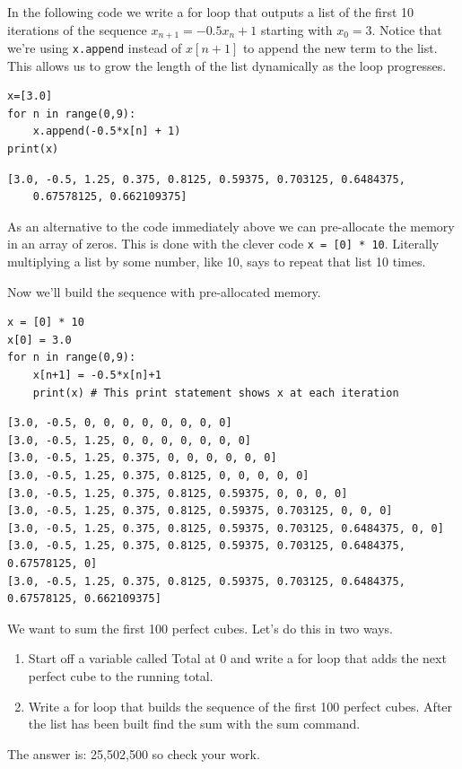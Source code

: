 \begin{example}
    In the following code we write a for loop that outputs a list of the first 10
    iterations of the sequence  $x_{n+1}=−0.5x_n+1$ starting with  $x_0=3$. Notice that
    we're using \texttt{x.append} instead of $x[n+1]$ to append the new term to the list.
    This allows us to grow the length of the list dynamically as the loop progresses.

    \bcode
\begin{lstlisting}
x=[3.0]
for n in range(0,9):
    x.append(-0.5*x[n] + 1)
print(x)
\end{lstlisting}
\boutput
\begin{lstlisting}
[3.0, -0.5, 1.25, 0.375, 0.8125, 0.59375, 0.703125, 0.6484375, 
    0.67578125, 0.662109375]
\end{lstlisting}
\end{example}
As an alternative to the code immediately above we can pre-allocate the memory in an array
of zeros. This is done with the clever code \texttt{x = [0] * 10}. Literally multiplying a
list by some number, like 10, says to repeat that list 10 times.

\begin{example}
    Now we'll build the sequence with pre-allocated memory.

    \bcode
\begin{lstlisting}
x = [0] * 10
x[0] = 3.0
for n in range(0,9):
    x[n+1] = -0.5*x[n]+1
    print(x) # This print statement shows x at each iteration
\end{lstlisting}
\boutput
\begin{lstlisting}
[3.0, -0.5, 0, 0, 0, 0, 0, 0, 0, 0]
[3.0, -0.5, 1.25, 0, 0, 0, 0, 0, 0, 0]
[3.0, -0.5, 1.25, 0.375, 0, 0, 0, 0, 0, 0]
[3.0, -0.5, 1.25, 0.375, 0.8125, 0, 0, 0, 0, 0]
[3.0, -0.5, 1.25, 0.375, 0.8125, 0.59375, 0, 0, 0, 0]
[3.0, -0.5, 1.25, 0.375, 0.8125, 0.59375, 0.703125, 0, 0, 0]
[3.0, -0.5, 1.25, 0.375, 0.8125, 0.59375, 0.703125, 0.6484375, 0, 0]
[3.0, -0.5, 1.25, 0.375, 0.8125, 0.59375, 0.703125, 0.6484375, 0.67578125, 0]
[3.0, -0.5, 1.25, 0.375, 0.8125, 0.59375, 0.703125, 0.6484375, 0.67578125, 0.662109375]
\end{lstlisting}
\end{example}

\begin{problem}
    We want to sum the first 100 perfect cubes. Let's do this in two ways.

    \begin{enumerate}
        \item Start off a variable called Total at 0 and write a for loop that adds the
            next perfect cube to the running total.
        \item  Write a for loop that builds the sequence of the first 100 perfect cubes.
            After the list has been built find the sum with the sum command.
    \end{enumerate}
    The answer is: 25,502,500 so check your work.
\end{problem}

